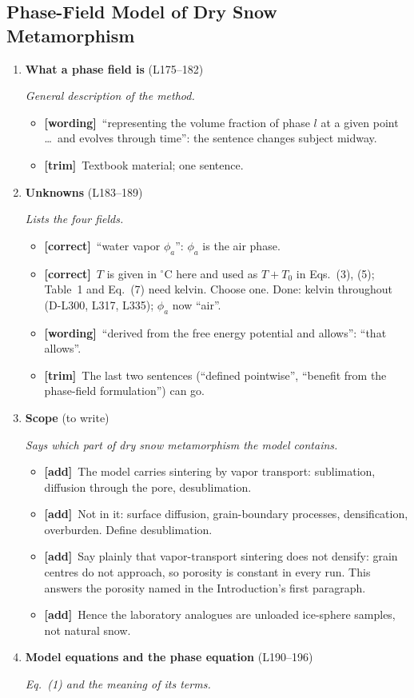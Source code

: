 \documentclass[11pt]{article}
\newcommand{\Pg}[3]{\item \textbf{#1} {\small(#2)}\par\textit{#3}}
\newcommand{\tC}{\textcolor{miss}{\textbf{[correct]}}\ }
\newcommand{\tG}{\textcolor{stale}{\textbf{[wording]}}\ }
\newcommand{\tT}{\textcolor{cut}{\textbf{[trim]}}\ }
\newcommand{\tA}{\textcolor{have}{\textbf{[add]}}\ }
\newcommand{\add}[1]{\textcolor{revA}{#1}}
\begin{document}
\subsection{Phase-Field Model of Dry Snow Metamorphism}
\begin{enumerate}
\Pg{What a phase field is}{L175--182}{General description of the method.}
  \begin{itemize}
  \item \tG ``representing the volume fraction of phase $l$ at a given point
    \ldots\ and evolves through time'': the sentence changes subject midway.
  \item \tT Textbook material; one sentence.
  \end{itemize}
\Pg{Unknowns}{L183--189}{Lists the four fields.}
  \begin{itemize}
  \item \tC ``water vapor $\phi_a$'': $\phi_a$ is the air phase.
  \item \tC $T$ is given in $^{\circ}$C here and used as $T + T_0$ in
    Eqs.~(3), (5); Table~1 and Eq.~(7) need kelvin. Choose one.
    \add{Done: kelvin throughout (D-L300, L317, L335); $\phi_a$ now ``air''.}
  \item \tG ``derived from the free energy potential and allows'': ``that
    allows''.
  \item \tT The last two sentences (``defined pointwise'', ``benefit from the
    phase-field formulation'') can go.
  \end{itemize}
\Pg{Scope}{to write}{Says which part of dry snow metamorphism the model contains.}
  \begin{itemize}
  \item \tA The model carries sintering by vapor transport: sublimation,
    diffusion through the pore, desublimation.
  \item \tA Not in it: surface diffusion, grain-boundary processes,
    densification, overburden. Define desublimation.
  \item \tA Say plainly that vapor-transport sintering does not densify: grain
    centres do not approach, so porosity is constant in every run. This
    answers the porosity named in the Introduction's first paragraph.
  \item \tA Hence the laboratory analogues are unloaded ice-sphere samples,
    not natural snow.
  \end{itemize}
\Pg{Model equations and the phase equation}{L190--196}{Eq.~(1) and the meaning of its terms.}

\end{enumerate}
\end{document}

